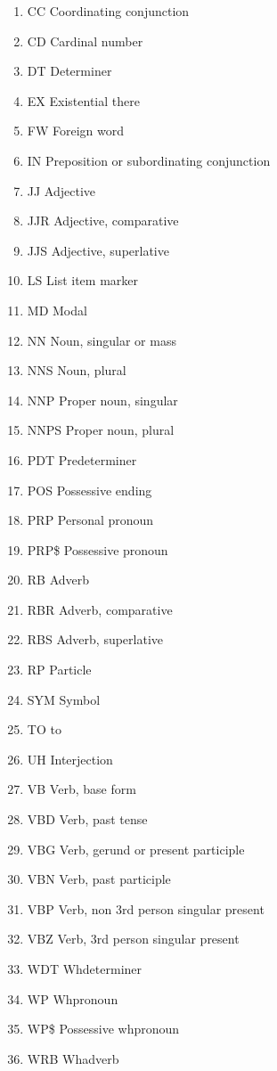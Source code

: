 \begin{enumerate}
  \item CC Coordinating conjunction
  \item CD Cardinal number
  \item DT Determiner
  \item EX Existential there
  \item FW Foreign word
  \item IN Preposition or subordinating conjunction
  \item JJ Adjective
  \item JJR Adjective, comparative
  \item JJS Adjective, superlative
  \item LS List item marker
  \item MD Modal
  \item NN Noun, singular or mass
  \item NNS Noun, plural
  \item NNP Proper noun, singular
  \item NNPS Proper noun, plural
  \item PDT Predeterminer
  \item POS Possessive ending
  \item PRP Personal pronoun
  \item PRP\$ Possessive pronoun
  \item RB Adverb
  \item RBR Adverb, comparative
  \item RBS Adverb, superlative
  \item RP Particle
  \item SYM Symbol
  \item TO to
  \item UH Interjection
  \item VB Verb, base form
  \item VBD Verb, past tense
  \item VBG Verb, gerund or present participle
  \item VBN Verb, past participle
  \item VBP Verb, non 3rd person singular present
  \item VBZ Verb, 3rd person singular present
  \item WDT Whdeterminer
  \item WP Whpronoun
  \item WP\$ Possessive whpronoun
  \item WRB Whadverb
\end{enumerate}

